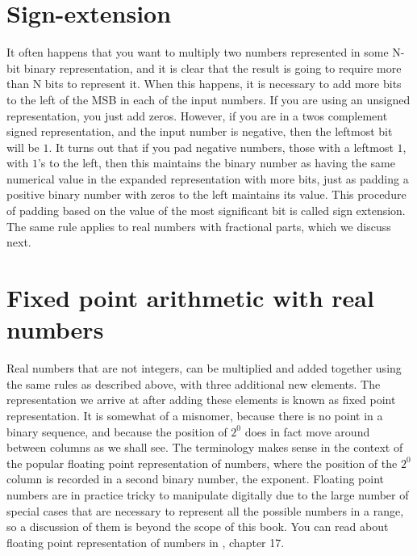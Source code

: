 \documentclass[../physical_computing.tex]{subfiles}
\begin{document}
\section{Sign-extension}
\label{sec:signextension}

It often happens that you want to multiply two numbers represented
in some N-bit binary representation, and it is clear that the 
result is going to require more than N bits to represent it. 
When this happens, it is necessary to add more bits to the left
of the MSB in each of the input numbers. If you are using 
an unsigned representation, you just add zeros. However, if you
are in a twos complement signed representation, and the input 
number is negative, then the leftmost bit will be $1$. It turns
out that if you pad negative numbers, those with a leftmost $1$, 
with $1$'s to the left, then this maintains the binary number
as having the same numerical value in the expanded representation
with more bits, just as padding a positive binary number with 
zeros to the left maintains its value. This procedure of padding
based on the value of the most significant bit is called 
sign extension. The same rule applies to real numbers with 
fractional parts, which we discuss next.

\section{Fixed point arithmetic with real numbers}
\label{sec:fixedpoint}

Real numbers that are not integers, can be multiplied and added together using the same rules as described above, with three
additional new elements. The representation we arrive at 
after adding these elements is known as fixed point representation.
It is somewhat of a misnomer, because there is no
point in a binary sequence, and because the position of 
$2^0$ does in fact move around between columns as we shall
see. The terminology makes sense in the context of the 
popular floating point representation of numbers, where the 
position of the $2^0$ column is recorded in a second binary 
number, the exponent. Floating point numbers are in practice
tricky to manipulate digitally due to the large number of
special cases that are necessary to represent all the 
possible numbers in a range, so a discussion of them is beyond
the scope of this book. You can read about floating point
representation of numbers in \cite{Warren:10.5555/2462741}, 
chapter 17.
\end{document}
